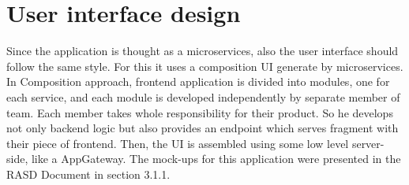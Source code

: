 \section{User interface design}
Since the application is thought as a microservices, also the user interface should follow the same style. For this it uses a composition UI generate by microservices. In Composition approach, frontend application is divided into modules, one for each service, and each module is developed independently by separate member of team. Each member takes whole responsibility for their product. So he develops not only backend logic but also provides an endpoint which serves fragment with their piece of frontend. Then, the UI is assembled using some low level server-side, like a AppGateway. The mock-ups for this application were presented in the RASD Document in section 3.1.1. 